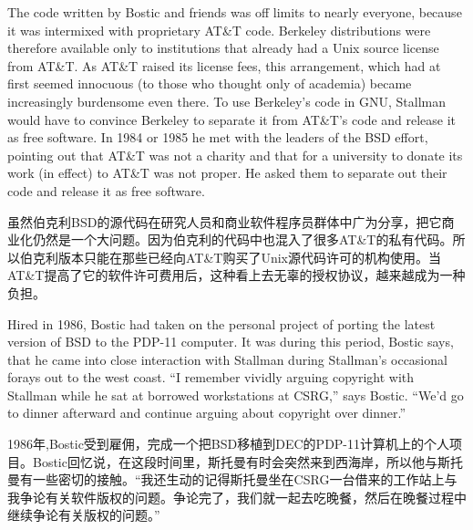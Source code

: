 \ifdefined\eng
The code written by Bostic and friends was off limits to nearly everyone, because it was intermixed with proprietary AT\&T code. Berkeley distributions were therefore available only to institutions that already had a Unix source license from AT\&T. As AT\&T raised its license fees, this arrangement, which had at first seemed innocuous (to those who thought only of academia) became increasingly burdensome even there.  To use Berkeley's code in GNU, Stallman would have to convince Berkeley to separate it from AT\&T's code and release it as free software.  In 1984 or 1985 he met with the leaders of the BSD effort, pointing out that AT\&T was not a charity and that for a university to donate its work (in effect) to AT\&T was not proper.  He asked them to separate out their code and release it as free software.
\fi

\ifdefined\chs
虽然伯克利BSD的源代码在研究人员和商业软件程序员群体中广为分享，把它商业化仍然是一个大问题。因为伯克利的代码中也混入了很多AT\&T的私有代码。所以伯克利版本只能在那些已经向AT\&T购买了Unix源代码许可的机构使用。当AT\&T提高了它的软件许可费用后，这种看上去无辜的授权协议，越来越成为一种负担。
\fi

\ifdefined\eng
Hired in 1986, Bostic had taken on the personal project of porting the latest version of BSD to the PDP-11 computer. It was during this period, Bostic says, that he came into close interaction with Stallman during Stallman's occasional forays out to the west coast. ``I remember vividly arguing copyright with Stallman while he sat at borrowed workstations at CSRG,'' says Bostic. ``We'd go to dinner afterward and continue arguing about copyright over dinner.''
\fi

\ifdefined\chs
1986年,Bostic受到雇佣，完成一个把BSD移植到DEC的PDP-11计算机上的个人项目。Bostic回忆说，在这段时间里，斯托曼有时会突然来到西海岸，所以他与斯托曼有一些密切的接触。“我还生动的记得斯托曼坐在CSRG一台借来的工作站上与我争论有关软件版权的问题。争论完了，我们就一起去吃晚餐，然后在晚餐过程中继续争论有关版权的问题。”
\fi

